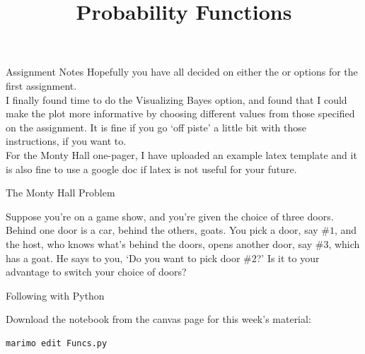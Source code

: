 \documentclass[10pt,sans,english,compress,table,xcolor=dvipsnames]{beamer}
\title[Funcs]{Probability Functions}
\date{}
\begin{document}



\begin{frame}
\titlepage
\end{frame} 

\begin{frame}{Assignment Notes} 
Hopefully you have all decided on either the  or  options for the first assignment.\\[1ex]

I finally found time to do the Visualizing Bayes option, and found that I could make the plot more informative by choosing different values from those specified on the assignment. It is fine if you go `off piste' a  little bit with those instructions, if you want to. \\[1ex]

For the Monty Hall one-pager, I have uploaded an example latex template and it is also fine to use a google doc if latex is not useful for your future.\\[1ex]
\end{frame}


\begin{frame}{The Monty Hall Problem } 

Suppose you're on a game show, and you're given the choice of three doors. Behind one door is a car, behind the others, goats. You pick a door, say $\#1$, and the host, who knows what's behind the doors, opens another door, say $\#3$, which has a goat. He says to you, `Do you want to pick door $\#2$?' Is it to your advantage to switch your choice of doors?\\[1ex]
\vspace{4cm}


\end{frame}



\begin{frame}[fragile]{Following with Python}


Download the notebook from the canvas page for this week's material:  \\[1ex]

\begin{verbatim}
marimo edit Funcs.py
\end{verbatim}

\end{frame} 
\end{document}
